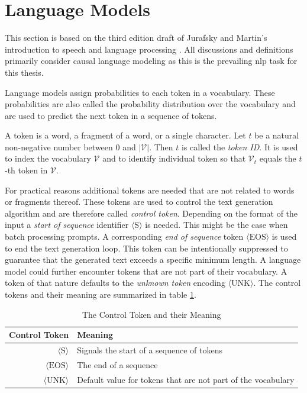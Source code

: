     \section{Language Models}
    This section is based on the third edition draft of Jurafsky and Martin's introduction to speech and language processing \cite{jurafsky2024speech}.
    All discussions and definitions primarily consider causal language modeling as this is the prevailing \ac{nlp} task for this thesis.

    Language models assign probabilities to each token in a vocabulary.
    These probabilities are also called the probability distribution over the vocabulary and are used to predict the next token in a sequence of tokens.

    \begin{definition}[token]
        A token is a word, a fragment of a word, or a single character.
        Let $t$ be a natural non-negative number between $0$ and $|\mathcal{V}|$.
        Then $t$ is called the \emph{token ID}.
        It is used to index the vocabulary $\mathcal{V}$ and to identify individual token so that $\mathcal{V}_t$ equals the $t$-th token in $\mathcal{V}$.
    \end{definition}

    For practical reasons additional tokens are needed that are not related to words or fragments thereof.
    These tokens are used to control the text generation algorithm and are therefore called \emph{control token}.
    Depending on the format of the input a \emph{start of sequence} identifier $\langle \mathrm{S} \rangle$ is needed.
    This might be the case when batch processing prompts.
    A corresponding \emph{end of sequence} token $\langle \mathrm{EOS} \rangle$ is used to end the text generation loop.
    This token can be intentionally suppressed to guarantee that the generated text exceeds a specific minimum length.
    A language model could further encounter tokens that are not part of their vocabulary.
    A token of that nature defaults to the \emph{unknown token} encoding $\langle \mathrm{UNK} \rangle$. 
    The control tokens and their meaning are summarized in table \ref{tab:controlToken}.

    \begin{table}
        \centering
        \begin{tabular}{rl}
            \toprule
            Control Token & Meaning \\
            \midrule
            $\langle \mathrm{S} \rangle$ & Signals the start of a sequence of tokens\\
            $\langle \mathrm{EOS} \rangle$ & The end of a sequence\\
            $\langle \mathrm{UNK} \rangle$ & Default value for tokens that are not part of the vocabulary\\
            \bottomrule
        \end{tabular}
        \caption{The Control Token and their Meaning}
        \label{tab:controlToken} 
    \end{table}

